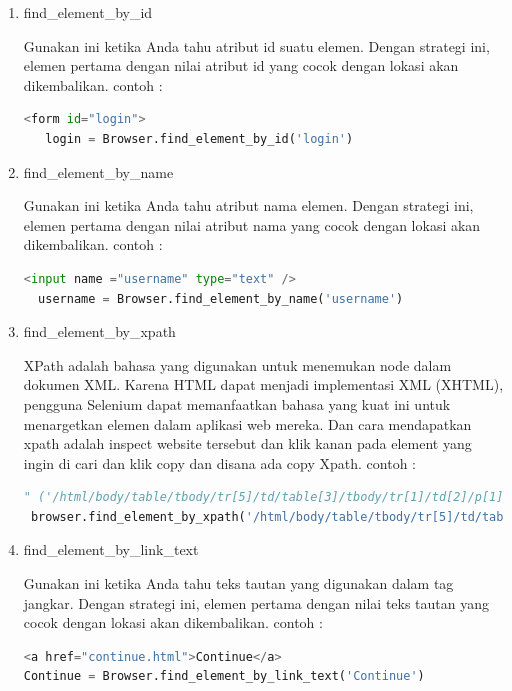 \begin{enumerate}
\item find_element_by_id
\par Gunakan ini ketika Anda tahu atribut id suatu elemen. Dengan strategi ini, elemen pertama dengan nilai atribut id yang cocok dengan lokasi akan dikembalikan.
contoh :
\begin{lstlisting}[language=Python]
<form id="login">
   login = Browser.find_element_by_id('login')
\end{lstlisting}

\item find_element_by_name
\par Gunakan ini ketika Anda tahu atribut nama elemen. Dengan strategi ini, elemen pertama dengan nilai atribut nama yang cocok dengan lokasi akan dikembalikan.
contoh :
\begin{lstlisting}[language=Python]
<input name ="username" type="text" />
  username = Browser.find_element_by_name('username')
\end{lstlisting}

\item find_element_by_xpath
\par XPath adalah bahasa yang digunakan untuk menemukan node dalam dokumen XML. Karena HTML dapat menjadi implementasi XML (XHTML), pengguna Selenium dapat memanfaatkan bahasa yang kuat ini untuk menargetkan elemen dalam aplikasi web mereka. Dan cara mendapatkan xpath adalah inspect website tersebut dan klik kanan pada element yang ingin di cari dan klik copy dan disana ada copy Xpath.
contoh :
\begin{lstlisting}[language=Python]
" ('/html/body/table/tbody/tr[5]/td/table[3]/tbody/tr[1]/td[2]/p[1]/table/tbody/tr/td[3]/select').click()" 
 browser.find_element_by_xpath('/html/body/table/tbody/tr[5]/td/table[3]/tbody/tr[1]/td[2]/p[1]/table/tbody/tr/td[3]/select').click()
\end{lstlisting}

\item find_element_by_link_text
\par Gunakan ini ketika Anda tahu teks tautan yang digunakan dalam tag jangkar. Dengan strategi ini, elemen pertama dengan nilai teks tautan yang cocok dengan lokasi akan dikembalikan. 
contoh :
\begin{lstlisting}[language=Python]
<a href="continue.html">Continue</a>
Continue = Browser.find_element_by_link_text('Continue')
\end{lstlisting}


\end{enumerate}
